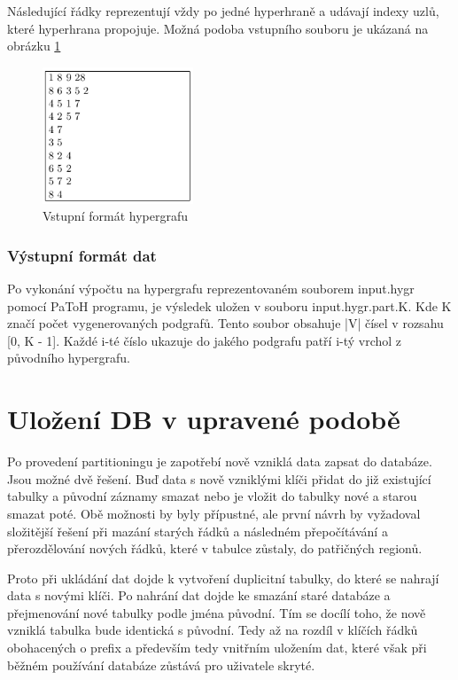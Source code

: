 \documentclass[thesis=M,czech]{FITthesis}[2012/06/26]
\begin{document}
Následující řádky reprezentují vždy po jedné hyperhraně a udávají indexy uzlů, které hyperhrana propojuje. Možná podoba vstupního souboru je ukázaná na obrázku \ref{fig:input}

\begin{figure}[h]\centering
	\includegraphics[width=0.4\textwidth, angle=0]{files/inputformat}
	\caption[Vstupní formát hypergrafu]
	{Vstupní formát hypergrafu}\label{fig:input}
\end{figure} 
\subsubsection{Výstupní formát dat}
Po vykonání výpočtu na hypergrafu reprezentovaném souborem input.hygr pomocí PaToH programu, je výsledek uložen v souboru input.hygr.part.K. Kde K značí počet vygenerovaných podgrafů. Tento soubor obsahuje |V| čísel v rozsahu [0, K - 1]. Každé i-té číslo ukazuje do jakého podgrafu  patří i-tý vrchol z původního hypergrafu.



\section{Uložení DB v upravené podobě}
Po provedení  partitioningu je zapotřebí nově vzniklá data zapsat do databáze. Jsou možné dvě řešení. Buď data s nově vzniklými klíči přidat do již existující tabulky a původní záznamy smazat nebo je vložit do tabulky nové a starou smazat poté. Obě možnosti by byly přípustné, ale první návrh by vyžadoval složitější řešení při mazání starých řádků a následném přepočítávání a přerozdělování nových řádků, které v tabulce zůstaly, do patřičných regionů. 

Proto při ukládání dat dojde k vytvoření duplicitní tabulky, do které se nahrají data s novými klíči. Po nahrání dat dojde ke smazání staré databáze a přejmenování nové tabulky podle jména původní. Tím se docílí toho, že nově vzniklá tabulka bude identická s původní. Tedy až na rozdíl v klíčích řádků obohacených o prefix a především tedy vnitřním uložením dat, které však při běžném používání databáze zůstává pro uživatele skryté. 
\end{document}
